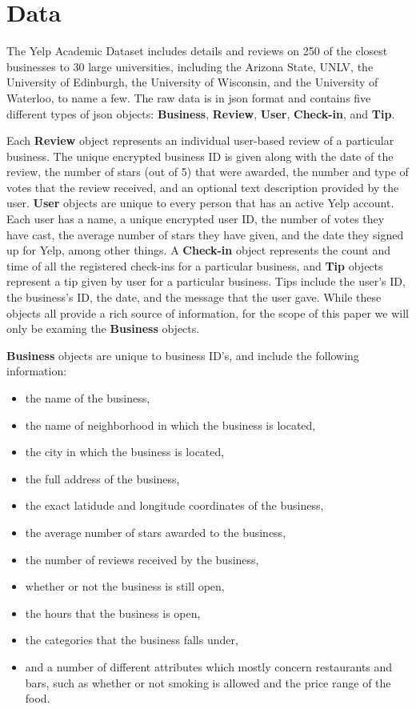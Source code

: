 \documentclass[11pt]{article}
\begin{document}
\section{Data}


The Yelp Academic Dataset includes details and reviews on 250 of the closest businesses to 30 large universities, including the Arizona State, UNLV, the University of Edinburgh, the University of Wisconsin, and the University of Waterloo, to name a few. The raw data is in json format and contains five different types of json objects: \textbf{Business}, \textbf{Review}, \textbf{User}, \textbf{Check-in}, and \textbf{Tip}.

Each \textbf{Review} object represents an individual user-based review of a particular business. The unique encrypted business ID is given along with the date of the review, the number of stars (out of 5) that were awarded, the number and type of votes that the review received, and an optional text description provided by the user. \textbf{User} objects are unique to every person that has an active Yelp account. Each user has a name, a unique encrypted user ID, the number of votes they have cast, the average number of stars they have given, and the date they signed up for Yelp, among other things. A \textbf{Check-in} object represents the count and time of all the registered check-ins for a particular business, and \textbf{Tip} objects represent a tip given by user for a particular business. Tips include the user's ID, the business's ID, the date, and the message that the user gave. While these objects all provide a rich source of information, for the scope of this paper we will only be examing the \textbf{Business} objects.

\textbf{Business} objects are unique to business ID's, and include the following information:
\begin{itemize}
	\item the name of the business,
	\item the name of neighborhood in which the business is located,
	\item the city in which the business is located,
	\item the full address of the business,
	\item the exact latidude and longitude coordinates of the business,
	\item the average number of stars awarded to the business,
	\item the number of reviews received by the business,
	\item whether or not the business is still open,
	\item the hours that the business is open,
	\item the categories that the business falls under,
	\item and a number of different attributes which mostly concern restaurants and bars, such as whether or not smoking is allowed and the price range of the food.
\end{itemize}
\end{document}
